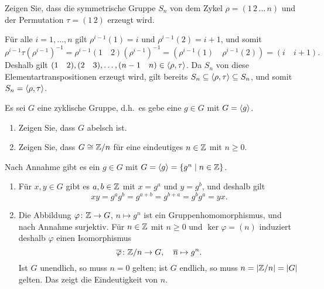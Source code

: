 \begin{question}
  Zeigen Sie, dass die symmetrische Gruppe $S_n$ von dem Zykel $\rho = (1 \, 2 \, \dotso \, n)$ und der Permutation $\tau = (1 \, 2)$ erzeugt wird.
\end{question}


\begin{solution}
  Für alle $i = 1, \dotsc, n$ gilt $\rho^{i-1}(1) = i$ und $\rho^{i-1}(2) = i+1$, und somit
  \[
    \rho^{i-1} \tau (\rho^{i-1})^{-1}
    = \rho^{i-1} (1 \quad 2) (\rho^{i-1})^{-1}
    = (\rho^{i-1}(1) \quad \rho^{i-1}(2))
    = (i \quad i+1).
  \]
  Deshalb gilt $(1 \quad 2), (2 \quad 3), \dotsc, (n-1 \quad n) \in \left\langle \rho, \tau \right\rangle$.
  Da $S_n$ von diese Elementartranspositionen erzeugt wird, gilt bereits $S_n \subseteq \left\langle \rho, \tau \right\rangle \subseteq S_n$, und somit $S_n = \left\langle \rho, \tau \right\rangle$.
\end{solution}


\begin{question}[subtitle = Klassifikation zyklischer Gruppen]
  Es sei $G$ eine zyklische Gruppe, d.h.\ es gebe eine $g \in G$ mit $G = \left\langle g \right\rangle$.
  \begin{enumerate}
    \item
      Zeigen Sie, dass $G$ abelsch ist.
    \item
      Zeigen Sie, dass $G \cong \mathbb{Z}/n$ für eine eindeutiges $n \in \mathbb{Z}$ mit $n \geq 0$.
  \end{enumerate}
\end{question}


\begin{solution}
  \label{question: classification of cyclic groups}
  Nach Annahme gibt es ein $g \in G$ mit $G = \left\langle g \right\rangle = \{g^n \mid n \in \mathbb{Z}\}$.
  \begin{enumerate}
    \item
      Für $x, y \in G$ gibt es $a, b \in \mathbb{Z}$ mit $x = g^a$ und $y = g^b$, und deshalb gilt
      \[
        xy = g^a g^b = g^{a+b} = g^{b+a} = g^b g^a = yx.
      \]
      
    \item
      Die Abbildung $\varphi \colon \mathbb{Z} \to G$, $n \mapsto g^n$ ist ein Gruppenhomomorphismus, und nach Annahme surjektiv.
      Für $n \in \mathbb{Z}$ mit $n \geq 0$ und $\ker \varphi = (n)$ induziert deshalb $\varphi$ einen Isomorphismus
      \[
        \overline{\varphi} \colon \mathbb{Z}/n \to G,
        \quad
        \overline{n} \mapsto g^n.
      \]
      Ist $G$ unendlich, so muss $n = 0$ gelten;
      ist $G$ endlich, so muss $n = |\mathbb{Z}/n| = |G|$ gelten.
      Das zeigt die Eindeutigkeit von $n$.
  \end{enumerate}
\end{solution}


